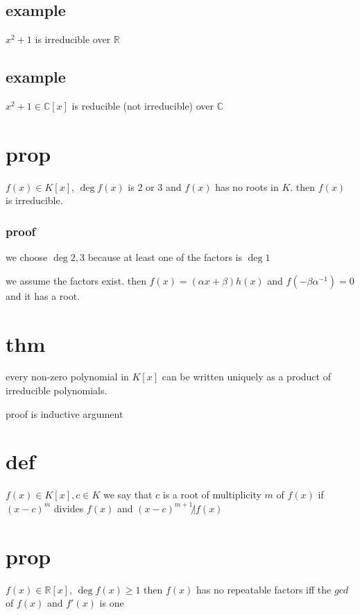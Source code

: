 \documentclass[letterpaper]{article}
\begin{document}
\subsection*{example}
$x^2+1$ is irreducible over $\mathbb{R}$
\subsection*{example}
$x^2+1\in \mathbb{C}[x]$ is reducible (not irreducible) over $\mathbb{C}$

\section*{prop}
$f(x)\in K[x]$, $\deg f(x)$ is $2$ or $3$ and $f(x)$ has no roots in $K$. then $f(x)$ is irreducible.

\subsubsection*{proof}
we choose $\deg 2,3$ because at least one of the factors is $\deg 1$

we assume the factors exist. then $f(x)=(\alpha x+\beta)h(x)$ and $f(-\beta\alpha^{-1})=0$ and it has a root.

\section*{thm}
every non-zero polynomial in  $K[x]$ can be written uniquely as a product of irreducible polynomials.

proof is inductive argument

\section*{def}
$f(x)\in K[x], c\in K$ we say that $c$ is a root of multiplicity $m$ of $f(x)$ if $(x-c)^m$ divides $f(x)$ and $(x-c)^{m+1}\not| f(x)$

\section*{prop}
$f(x)\in \mathbb{R}[x]$, $\deg f(x)\ge 1$ then $f(x)$ has no repeatable factors iff the $gcd$ of $f(x)$ and $f'(x)$ is one
\end{document}
